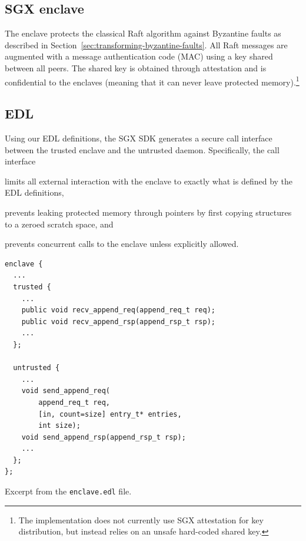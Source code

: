 \documentclass{article}
\begin{document}
	\subsection*{SGX enclave}

	The enclave protects the classical Raft algorithm against Byzantine faults as described in Section~\ref{sec:transforming-byzantine-faults}.
	All Raft messages are augmented with a message authentication code (MAC) using a key shared between all peers.
	The shared key is obtained through attestation and is confidential to the enclaves (meaning that it can never leave protected memory).\footnote{The implementation does not currently use SGX attestation for key distribution, but instead relies on an unsafe hard-coded shared key.}

	\subsection*{EDL}

	Using our EDL definitions, the SGX SDK generates a secure call interface between the trusted enclave and the untrusted daemon.
	Specifically, the call interface
	\begin{enumerate*}[label=\textbf{(\alph*)}]
		\item limits all external interaction with the enclave to exactly what is defined by the EDL definitions,
		\item prevents leaking protected memory through pointers by first copying structures to a zeroed scratch space, and
		\item prevents concurrent calls to the enclave unless explicitly allowed.
	\end{enumerate*}

	\begin{snippet}
		\begin{mdframed}[backgroundcolor=Papyrus]
			\begin{lstlisting}[basicstyle=\small\ttfamily]
enclave {
  ...
  trusted {
    ...
    public void recv_append_req(append_req_t req);
    public void recv_append_rsp(append_rsp_t rsp);
    ...
  };

  untrusted {
    ...
    void send_append_req(
    	append_req_t req,
    	[in, count=size] entry_t* entries,
    	int size);
    void send_append_rsp(append_rsp_t rsp);
    ...
  };
};
			\end{lstlisting}
		\end{mdframed}
		\caption{Excerpt from the \texttt{enclave.edl} file.}
		\label{listing:edl}
	\end{snippet}
	\FloatBarrier
\end{document}
